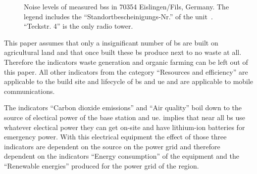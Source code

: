 \documentclass[11pt,a4paper]{article}
\begin{document}
\begin{figure}[h]
  \centering
  \caption{Noise levels of measured \acrshort{bs}s in 70354 Eislingen/Fils, Germany. The legend includes the \enquote{Standortbescheinigungs-Nr.} of the unit~\citep{EMFKarte}. \enquote{Teckstr. 4} is the only radio tower.}\label{fig:noise-measurements}
\end{figure}

This paper assumes that only a insignificant number of \acrshort{bs} are built on agricultural land and that once built these \acrshort{bs} produce next to no waste at all.
Therefore the indicators waste generation and organic farming can be left out of this paper.
All other indicators from the category \enquote{Resources and efficiency} are applicable to the build site and lifecycle of \acrshort{bs} and \acrshort{ue} and are applicable to mobile communications.

The indicators \enquote{Carbon dioxide emissions} and \enquote{Air quality} boil down to the source of electical power of the base station and \acrshort{ue}.
\citep{powerwhitepaper} implies that near all \acrshort{bs} use whatever electical power they can get on-site and have lithium-ion batteries for emergency power.
With this electrical equipment the effect of those three indicators are dependent on the source on the power grid and therefore dependent on the indicators \enquote{Energy consumption} of the equipment and the \enquote{Renewable energies} produced for the power grid of the region.
\end{document}
